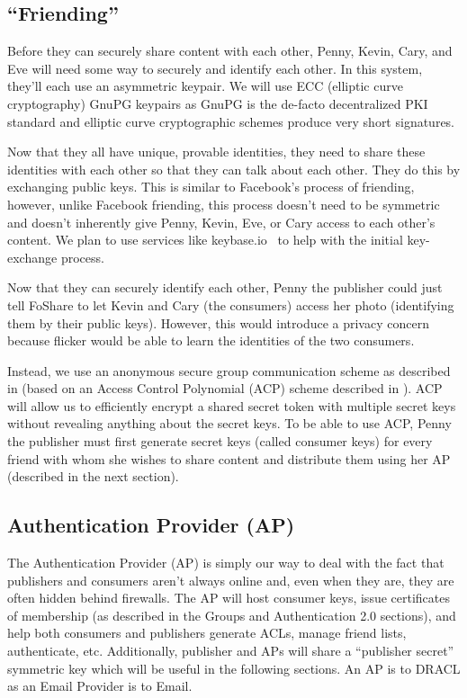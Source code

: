 \documentclass[pdftex,12pt,a4papaer]{article}
\begin{document}
\subsection{``Friending''}

Before they can securely share content with each other, Penny, Kevin, Cary, and
Eve will need some way to securely and identify each other. In this system,
they'll each use an asymmetric keypair. We will use ECC (elliptic curve
cryptography) GnuPG keypairs as GnuPG is the de-facto decentralized PKI standard
and elliptic curve cryptographic schemes produce very short signatures.

Now that they all have unique, provable identities, they need to share these
identities with each other so that they can talk about each other. They do this
by exchanging public keys. This is similar to Facebook's process of friending,
however, unlike Facebook friending, this process doesn't need to be symmetric
and doesn't inherently give Penny, Kevin, Eve, or Cary access to each other's
content.  We plan to use services like keybase.io~\cite{keybase} to help with
the initial key-exchange process.

Now that they can securely identify each other, Penny the publisher could just
tell FoShare to let Kevin and Cary (the consumers) access her photo
(identifying them by their public keys). However, this would introduce a privacy
concern because flicker would be able to learn the identities of the two
consumers.

Instead, we use an anonymous secure group communication scheme as described in
\cite{acp2} (based on an Access Control Polynomial (ACP) scheme described in
\cite{acp}). ACP will allow us to efficiently encrypt a shared secret token with
multiple secret keys without revealing anything about the secret keys. To be
able to use ACP, Penny the publisher must first generate secret keys (called
consumer keys) for every friend with whom she wishes to share content and
distribute them using her AP (described in the next section).

\subsection{Authentication Provider (AP)}

The Authentication Provider (AP) is simply our way to deal with the fact that
publishers and consumers aren't always online and, even when they are, they are
often hidden behind firewalls. The AP will host consumer keys, issue
certificates of membership (as described in the Groups and Authentication 2.0
sections), and help both consumers and publishers generate ACLs, manage friend
lists, authenticate, etc. Additionally, publisher and APs will share a
``publisher secret'' symmetric key which will be useful in the following
sections. An AP is to DRACL as an Email Provider is to Email.
\end{document}
